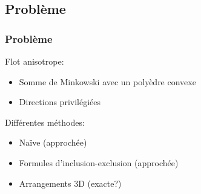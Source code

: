\documentclass{beamer}
\begin{document}
\subsection{Problème}
\begin{frame}
    \frametitle{Problème}

    Flot anisotrope:
    \begin{itemize}
        \item Somme de Minkowski avec un polyèdre convexe
        \item Directions privilégiées
    \end{itemize}

    Différentes méthodes:
    \begin{itemize}
        \item Naïve (approchée)
        \item Formules d'inclusion-exclusion (approchée)
        \item Arrangements 3D (exacte?)
    \end{itemize}
\end{frame}
\end{document}
